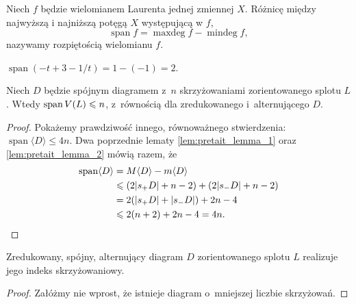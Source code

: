 \begin{definition}[rozpiętość]
%
    Niech $f$ będzie wielomianem Laurenta jednej zmiennej $X$.
    Różnicę między najwyższą i najniższą potęgą $X$ występującą w $f$,
    \begin{equation}
        \operatorname{span} f = \operatorname{maxdeg} f - \operatorname{mindeg} f,
    \end{equation}
    nazywamy rozpiętością wielomianu $f$.
\end{definition}

\begin{example}
    $\operatorname{span} (-t+3-1/t) = 1 - (-1) = 2$.
\end{example}

\begin{proposition}
    Niech $D$ będzie spójnym diagramem z~$n$ skrzyżowaniami zorientowanego splotu $L$.
    Wtedy $\operatorname{span} \jones(L) \le n$, z~równością dla zredukowanego i~alternującego $D$.
\end{proposition}

\begin{proof}
    Pokażemy prawdziwość innego, równoważnego stwierdzenia: $\operatorname{span} \langle D\rangle\le 4n$.
    Dwa poprzednie lematy \ref{lem:pretait_lemma_1} oraz \ref{lem:pretait_lemma_2} mówią razem, że
    \begin{align}
        \operatorname{span}\langle D\rangle
        & = M\langle D\rangle - m\langle D\rangle \\
        & \le (2|s_+D|+n-2)+(2|s_-D|+n-2) \\
        & = 2(|s_+D|+|s_- D|)+2n-4 \\
        & \le 2(n+2)+2n-4 = 4n. \qedhere
    \end{align}
\end{proof}

\begin{conjecture}
%
    Zredukowany, spójny, alternujący diagram $D$ zorientowanego splotu $L$ realizuje jego indeks skrzyżowaniowy.
\end{conjecture}

\begin{proof}
    Załóżmy nie wprost, że istnieje diagram o~mniejszej liczbie skrzyżowań. %
\end{proof}

